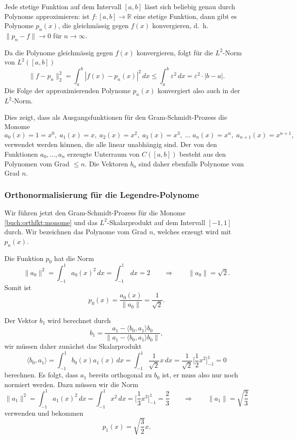 \begin{satz}[Weierstrass]
Jede stetige Funktion auf dem Intervall $[a,b]$ lässt sich beliebig
genau durch Polynome approximieren: ist $f\colon [a,b]\to\mathbb{R}$
eine stetige Funktion, dann gibt es Polynome $p_n(x)$, die gleichmässig
gegen $f(x)$ konvergieren, d.~h.~\(
\|p_n-f\| \to 0
\)
für $n\to\infty$.
\end{satz}

Da die Polynome gleichmässig gegen $f(x)$ konvergieren, folgt für die
$L^2$-Norm von $L^2([a,b])$
\[
\| f-p_n \|_2^2
=
\int_a^b |f(x)-p_n(x)|^2\,dx
\le 
\int_a^b \varepsilon^2 \,dx
=
\varepsilon^2\cdot |b-a|.
\]
Die Folge der approximierenden Polynome $p_n(x)$ konvergiert also
auch in der $L^2$-Norm.

Dies zeigt, dass als Ausgangsfunktionen für den Gram-Schmidt-Prozess
die Monome
\begin{equation}
a_0(x)=1=x^0,\;
a_1(x)=x,\;
a_2(x)=x^2,\;
a_3(x)=x^3,\;
\ldots\;
a_n(x)=x^n,\;
a_{n+1}(x)=x^{n+1},\;
\label{buch:orthfkt:monome}
\end{equation}
verwendet werden können, die alle linear unabhängig sind.
Der von den Funktionen $a_0,\dots,a_n$ erzeugte Unterraum von
$C([a,b])$ besteht aus den Polynomen vom Grad $\le n$.
Die Vektoren $b_n$ sind daher ebenfalls Polynome vom Grad $n$.

%
%
\subsubsection{Orthonormalisierung für die Legendre-Polynome}
Wir führen jetzt den Gram-Schmidt-Prozess für die Monome
\eqref{buch:orthfkt:monome}
und das $L^2$-Skalarprodukt auf dem Intervall $[-1,1]$ durch.
Wir bezeichnen das Polynome vom Grad $n$, welches erzeugt wird mit $p_n(x)$.

Die Funktion $p_0$ hat die Norm
\[
\|a_0\|^2
=
\int_{-1}^1 a_0(x)^2\,dx
=
\int_{-1}^1 \,dx
=
2
\qquad\Rightarrow\qquad
\|a_0\| = \!\sqrt{2}.
\]
Somit ist
\[
p_0(x) = \frac{a_0(x)}{\|a_0\|} = \frac{1}{\!\sqrt{2}}.
\]

Der Vektor $b_1$ wird berechnet durch
\[
b_1
=
\frac{
a_1-\langle b_0,a_1\rangle b_0
}{
\|
a_1-\langle b_0,a_1\rangle b_0
\|
},
\]
wir müssen daher zunächst das Skalarprodukt
\[
\langle b_0,a_1\rangle
=
\int_{-1}^1 b_0(x)a_1(x)\,dx
=
\int_{-1}^1 \frac{1}{\!\sqrt{2}} x\,dx
=
\frac{1}{\!\sqrt{2}} \biggl[\frac12x^2\biggr]_{-1}^1=0
\]
berechnen.
Es folgt, dass $a_1$ bereits orthogonal zu $b_0$ ist, er muss also
nur noch normiert werden.
Dazu müssen wir die Norm
\[
\| a_1\|^2
=
\int_{-1}^1 a_1(x)^2\,dx
=
\int_{-1}^1 x^2\,dx
=
\biggl[\frac13x^3\biggr]_{-1}^1
=
\frac{2}{3}
\qquad\Rightarrow\qquad
\|a_1\|
=
\!\sqrt{\frac{2}{3}}
\]
verwenden und bekommen
\[
p_1(x) = \!\sqrt{\frac{3}{2}} x.
\]

